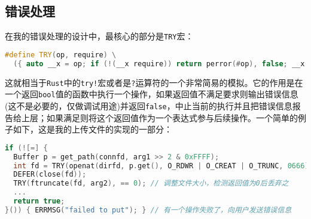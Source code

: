 \documentclass[12pt, UTF8]{article}
\begin{document}
\subsection{错误处理}

在我的错误处理的设计中，最核心的部分是\lstinline|TRY|宏：

\begin{lstlisting}[language = C++, ndkeywords = { TRY }]
#define TRY(op, require) \
  ({ auto __x = op; if (!(__x require)) return perror(#op), false; __x; })
\end{lstlisting}

这就相当于\lstinline|Rust|中的\lstinline|try!|宏或者是\lstinline|?|运算符的一个非常简易的模拟。它的作用是在一个返回\lstinline|bool|值的函数中执行一个操作，如果返回值不满足要求则输出错误信息(这不是必要的，仅做调试用途)并返回\lstinline|false|，中止当前的执行并且把错误信息报告给上层；如果满足则将这个返回值作为一个表达式参与后续操作。一个简单的例子如下，这是我的上传文件的实现的一部分：

\begin{lstlisting}[language = C++, morekeywords = { u32, nullptr }, ndkeywords = { TRY }]
if (![=] {
  Buffer p = get_path(connfd, arg1 >> 2 & 0xFFFF);
  int fd = TRY(openat(dirfd, p.get(), O_RDWR | O_CREAT | O_TRUNC, 0666), > 0); // 打开文件，只有返回值 > 0时才继续操作
  DEFER(close(fd));
  TRY(ftruncate(fd, arg2), == 0); // 调整文件大小，检测返回值为0后丢弃之
  ...
  return true;
}()) { ERRMSG("failed to put"); } // 有一个操作失败了，向用户发送错误信息
\end{lstlisting}
\end{document}
